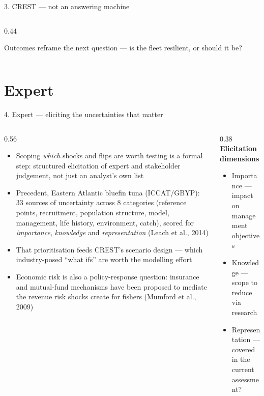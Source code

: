 \documentclass[10pt,aspectratio=169]{beamer}
\begin{document}
\begin{frame}{3. CREST --- not an answering machine}
\begin{columns}[T]
\begin{column}{0.44\textwidth}
      \vspace{2mm}

      \scriptsize Outcomes reframe the next question --- is the fleet resilient, or should it be?\par
    \end{column}
  \end{columns}
\end{frame}

\section{Expert}

\begin{frame}{4. Expert --- eliciting the uncertainties that matter}
  \begin{columns}[T]
    \begin{column}{0.56\textwidth}
      \footnotesize
      \begin{itemize}
        \item Scoping \emph{which} shocks and flips are worth testing is a formal step: structured elicitation of expert and stakeholder judgement, not just an analyst's own list
        \item Precedent, Eastern Atlantic bluefin tuna (ICCAT/GBYP): 33 sources of uncertainty across 8 categories (reference points, recruitment, population structure, model, management, life history, environment, catch), scored for \emph{importance}, \emph{knowledge} and \emph{representation} (Leach et al., 2014)
        \item That prioritisation feeds CREST's scenario design --- which industry-posed ``what ifs'' are worth the modelling effort
        \item Economic risk is also a policy-response question: insurance and mutual-fund mechanisms have been proposed to mediate the revenue risk shocks create for fishers (Mumford et al., 2009)
      \end{itemize}
    \end{column}
    \begin{column}{0.38\textwidth}
      \footnotesize
      \centering
      \textbf{Elicitation dimensions}
      \begin{itemize}
        \item Importance --- impact on management objectives
        \item Knowledge --- scope to reduce via research
        \item Representation --- covered in the current assessment?

\end{itemize}
\end{column}
\end{columns}
\end{frame}
\end{document}
